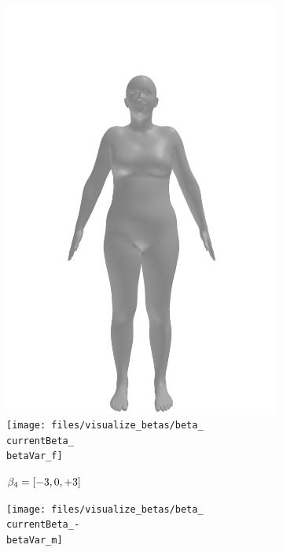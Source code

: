 \begin{figure}[h!]
\begin{subfigure}{\betaWidth}
        \includegraphics[width=\imgWidth]{files/visualize_betas/baseline_f}
        \texttt{[image: files/visualize\_betas/beta\_\\currentBeta\_\\betaVar\_f]}
        \caption{$\beta_4 = [-3, 0, +3]$}
    \end{subfigure}
    \begin{subfigure}{\betaWidth}
        \def\currentBeta{4}
        \centering
        \texttt{[image: files/visualize\_betas/beta\_\\currentBeta\_-\\betaVar\_m]}

\end{subfigure}
\end{figure}
